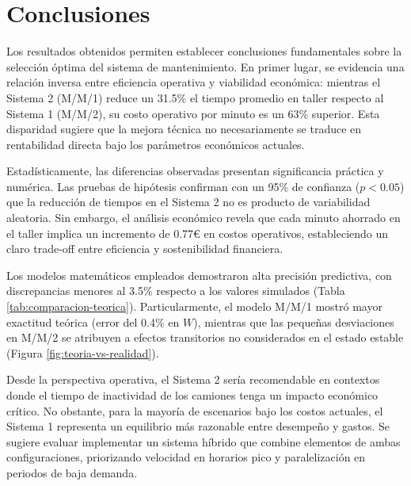 \documentclass[a4paper, 12pt]{article}
\begin{document}
  
  \section{Conclusiones} \label{sec:conclusiones}
  
  Los resultados obtenidos permiten establecer conclusiones fundamentales sobre la selección óptima del sistema de mantenimiento. En primer lugar, se evidencia una relación inversa entre eficiencia operativa y viabilidad económica: mientras el Sistema 2 (M/M/1) reduce un 31.5\% el tiempo promedio en taller respecto al Sistema 1 (M/M/2), su costo operativo por minuto es un 63\% superior. Esta disparidad sugiere que la mejora técnica no necesariamente se traduce en rentabilidad directa bajo los parámetros económicos actuales.
  
  Estadísticamente, las diferencias observadas presentan significancia práctica y numérica. Las pruebas de hipótesis confirman con un 95\% de confianza ($p < 0.05$) que la reducción de tiempos en el Sistema 2 no es producto de variabilidad aleatoria. Sin embargo, el análisis económico revela que cada minuto ahorrado en el taller implica un incremento de 0.77€ en costos operativos, estableciendo un claro trade-off entre eficiencia y sostenibilidad financiera.
  
  Los modelos matemáticos empleados demostraron alta precisión predictiva, con discrepancias menores al 3.5\% respecto a los valores simulados (Tabla \ref{tab:comparacion-teorica}). Particularmente, el modelo M/M/1 mostró mayor exactitud teórica (error del 0.4\% en $W$), mientras que las pequeñas desviaciones en M/M/2 se atribuyen a efectos transitorios no considerados en el estado estable (Figura \ref{fig:teoria-vs-realidad}).
  
  Desde la perspectiva operativa, el Sistema 2 sería recomendable en contextos donde el tiempo de inactividad de los camiones tenga un impacto económico crítico. No obstante, para la mayoría de escenarios bajo los costos actuales, el Sistema 1 representa un equilibrio más razonable entre desempeño y gastos. Se sugiere evaluar implementar un sistema híbrido que combine elementos de ambas configuraciones, priorizando velocidad en horarios pico y paralelización en periodos de baja demanda.
	
\end{document}
